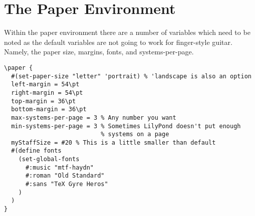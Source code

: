 \documentclass[]{memoir}
\begin{document}
\section{The Paper Environment}
\label{sec:paper-environment}

Within the paper environment there are a number of variables which
need to be noted as the default variables are not going to work for
finger-style guitar. Namely, the paper size, margins, fonts, and
systems-per-page.
\begin{verbatim}
\paper {
  #(set-paper-size "letter" 'portrait) % 'landscape is also an option
  left-margin = 54\pt 
  right-margin = 54\pt
  top-margin = 36\pt
  bottom-margin = 36\pt
  max-systems-per-page = 3 % Any number you want
  min-systems-per-page = 3 % Sometimes LilyPond doesn't put enough 
                           % systems on a page
  myStaffSize = #20 % This is a little smaller than default
  #(define fonts
    (set-global-fonts
      #:music "mtf-haydn"
      #:roman "Old Standard"
      #:sans "TeX Gyre Heros"
    )
  )
}
\end{verbatim}

\backmatter
\printindex
\end{document}

